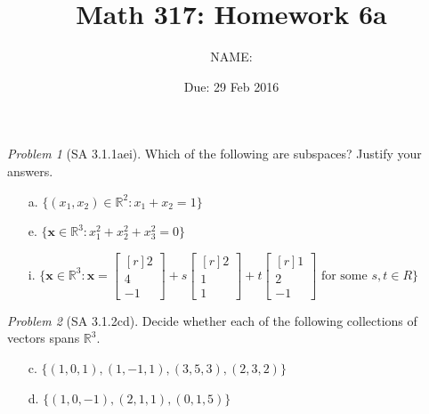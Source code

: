 \documentclass[fleqn,11pt]{paper}
\author         {NAME:                     }
\title{Math 317: Homework 6a}
\date{Due: 29 Feb 2016}
\theoremstyle{remark}
\newtheorem{problem}{Problem}
\newtheorem*{solution}{{\bf Solution}}
\newcommand\R{\fld{R}}
\renewcommand{\vec}[1]{\mathbf{#1}}
\newcommand{\<}{\ensuremath{\langle}}
\renewcommand{\>}{\ensuremath{\rangle}}
\newcommand\fld[1]{\ensuremath{\mathbb{#1}}}
\newcommand\vx{\vec{x}}
\begin{document}
\maketitle

\begin{problem}[SA 3.1.1aei]
Which of the following are subspaces? Justify your answers.
\begin{enumerate}
\item[a.] $\{(x_1, x_2) \in \R^2: x_1 + x_2 = 1\}$
\item[e.] $\{\vx \in \R^3 : x_1^2 + x_2^2+ x_3^2 = 0\}$
\item[i.] $\{\vx \in \R^3: \vx = \begin{bmatrix*}[r] 2\\4\\-1\end{bmatrix*} 
+s\begin{bmatrix*}[r] 2\\1\\1\end{bmatrix*} 
+t\begin{bmatrix*}[r] 1\\2\\-1\end{bmatrix*} \text{ for some } s, t \in R\}$
\end{enumerate}
\end{problem}
\newpage

\begin{problem}[SA 3.1.2cd]
Decide whether each of the following collections of vectors spans $\R^3$.
\begin{enumerate}
\item[c.] $\{(1, 0, 1), (1, -1, 1), (3, 5, 3), (2, 3, 2)\}$
\item[d.] $\{(1, 0, -1), (2, 1, 1), (0, 1, 5)\}$
\end{enumerate}
\end{problem}
\newpage
\end{document}

